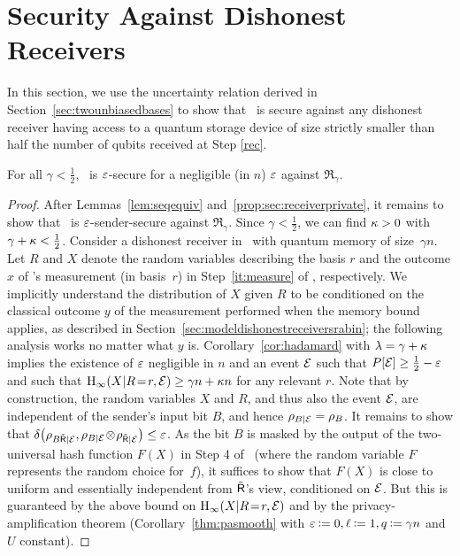 \section{Security Against Dishonest Receivers}\label{sec:otsecurity}
In this section, we use the uncertainty relation derived in
Section~\ref{sec:twounbiasedbases} to show that \eprqot\ is secure
against any dishonest receiver having access to a quantum storage
device of size strictly smaller than half the number of qubits
received at Step \ref{rec}.

\begin{theorem}\label{thm:privacyeprqot}
For all $\gamma < \frac12$, \qot\ is $\eps$-secure for a negligible (in $n$) $\eps$ 
against $\mathfrak{R}_{\gamma}$.
\end{theorem}
\begin{proof}
  After Lemmas~\ref{lem:seqequiv} and~\ref{prop:sec:receiverprivate},
  it remains to show that \eprqot\ is $\eps$-sender-secure against
  $\mathfrak{R}_{\gamma}$.  Since \mbox{$\gamma < \frac{1}{2}$}, we
  can find $\sp > 0$ with \mbox{$\gamma + \sp < \frac{1}{2}$}.
  Consider a dishonest receiver \smash{$\dB$} in \eprqot\ with quantum
  memory of size~$\gamma n$.  Let $R$ and $X$ denote the random
  variables describing the basis $r$ and the outcome $x$ of \A's
  measurement (in basis~$r$) in Step~\ref{it:measure} of \eprqot,
  respectively.  We implicitly understand the distribution of $X$
  given $R$ to be conditioned on the classical outcome $y$ of the
  measurement \smash{$\dB$} performed when the memory bound applies,
  as described in Section~\ref{sec:modeldishonestreceiversrabin}; the
  following analysis works no matter what $y$ is.
  Corollary~\ref{cor:hadamard} with $\lambda = \gamma + \sp$ implies
  the existence of $\eps$ negligible in $n$ and an event $\ev$ such
  that $\P[\ev] \geq \frac12 - \eps$ and such that
  $\H_{\infty}(X|R\!=\!r,\ev) \geq \gamma n + \sp n$ for any relevant
  $r$.  Note that by construction, the random variables $X$ and $R$,
  and thus also the event $\ev$, are independent of the sender's input
  bit $B$, and hence $\rho_{B|\ev} = \rho_B$.  It remains to show that
  $\dist{ \rho_{B\dB|\ev},\rho_{B|\ev}\!\otimes\!\rho_{\dB|\ev} } \leq
  \eps$.  As the bit $B$ is masked by the output of the
  two-universal hash function $F(X)$ in Step 4 of \eprqot\ (where the
  random variable $F$ represents the random choice for~$f$), it
  suffices to show that $F(X)$ is close to uniform and essentially
  independent from $\dB$'s view, conditioned on $\ev$.  But this is
  guaranteed by the above bound on $\H_{\infty}(X|R\!=\!r,\ev)$ and by
  the  privacy-amplification theorem
  (Corollary~\ref{thm:pasmooth} with $\eps \assign 0, \ell \assign 1,
  q \assign \gamma n$ and $U$ constant).
\end{proof}

